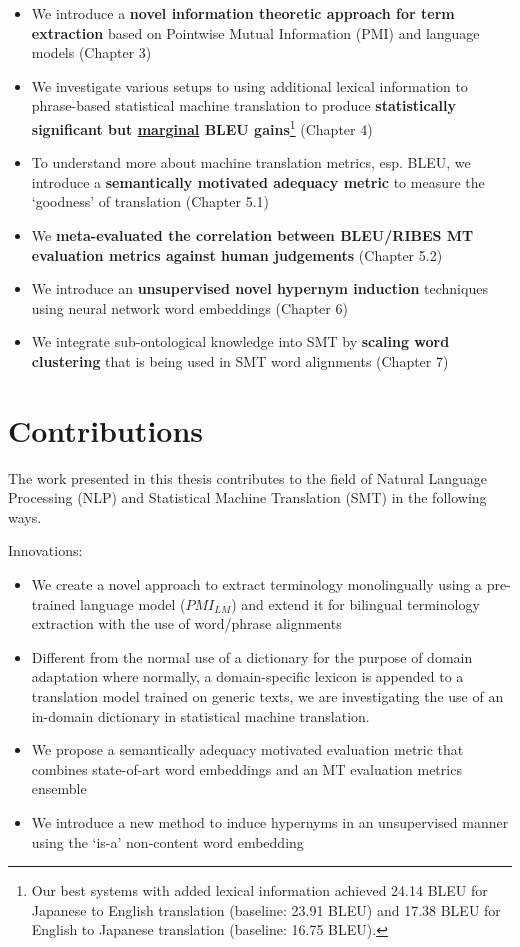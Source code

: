 \begin{itemize}[noitemsep]
\item We introduce a \textbf{novel information theoretic approach for term extraction} based on Pointwise Mutual Information (PMI) and language models (Chapter 3)
\item We investigate various setups to using additional lexical information to phrase-based statistical machine translation to produce \textbf{statistically significant but \underline{marginal} BLEU gains}\footnote{Our best systems with added lexical information achieved 24.14 BLEU for Japanese to English translation (baseline: 23.91 BLEU) and 17.38 BLEU for English to Japanese translation (baseline: 16.75 BLEU).} (Chapter 4)
\item To understand more about machine translation metrics, esp. BLEU, we introduce a \textbf{semantically motivated adequacy metric} to measure the `goodness' of translation (Chapter 5.1)
\item We \textbf{meta-evaluated the correlation between BLEU/RIBES MT evaluation metrics against human judgements} (Chapter 5.2)
\item We introduce an \textbf{unsupervised novel hypernym induction} techniques using neural network word embeddings (Chapter 6)
\item We integrate sub-ontological knowledge into SMT by \textbf{scaling word clustering} that is being used in SMT word alignments (Chapter 7)
\end{itemize}


\section{Contributions}

The work presented in this thesis contributes to the field of Natural Language Processing (NLP) and Statistical Machine Translation (SMT) in the following ways. 

Innovations:

\begin{itemize}
\item We create a novel approach to extract terminology monolingually using a pre-trained language model ($PMI_{LM}$) and extend it for bilingual terminology extraction with the use of word/phrase alignments
\item Different from the normal use of a dictionary for the purpose of domain adaptation where normally, a domain-specific lexicon is appended to a translation model trained on generic texts, we are investigating the use of an in-domain dictionary in statistical machine translation.
\item We propose a semantically adequacy motivated evaluation metric that combines state-of-art word embeddings and an MT evaluation metrics ensemble 
\item We introduce a new method to induce hypernyms in an unsupervised manner using the `is-a' non-content word embedding
\end{itemize}

